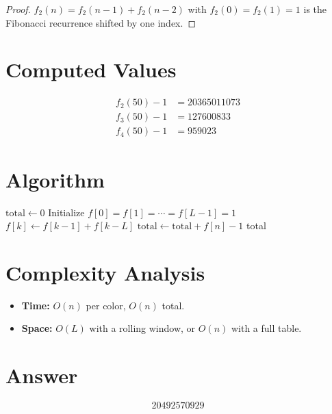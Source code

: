 \documentclass[12pt]{article}
\begin{document}
\begin{proof}
$f_2(n) = f_2(n-1) + f_2(n-2)$ with $f_2(0) = f_2(1) = 1$ is the Fibonacci recurrence shifted by one index.
\end{proof}

\section{Computed Values}

\begin{align*}
f_2(50) - 1 &= 20365011073 \\
f_3(50) - 1 &= 127600833 \\
f_4(50) - 1 &= 959023
\end{align*}

\section{Algorithm}

\begin{algorithm}[H]
\caption{Compute answer for Problem 116}
\begin{algorithmic}[1]
\State $\text{total} \gets 0$
    \State Initialize $f[0] = f[1] = \cdots = f[L-1] = 1$
        \State $f[k] \gets f[k-1] + f[k-L]$
    \EndFor
    \State $\text{total} \gets \text{total} + f[n] - 1$
\EndFor
\State \Return total
\end{algorithmic}
\end{algorithm}

\section{Complexity Analysis}

\begin{itemize}
\item \textbf{Time:} $O(n)$ per color, $O(n)$ total.
\item \textbf{Space:} $O(L)$ with a rolling window, or $O(n)$ with a full table.
\end{itemize}

\section{Answer}

\[
\boxed{20492570929}
\]
\end{document}
